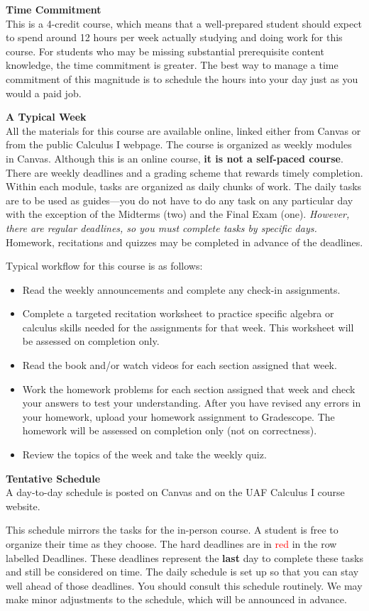 \documentclass[12pt]{article}
\renewcommand{\emph}[1]{\textsf{\textbf{#1}}}
\newcommand{\localhead}[1]{\par\smallskip\textbf{#1}\nobreak\\}%
\def\heading#1{\localhead{\large\emph{#1}}}
\begin{document}
\heading{Time Commitment}
This is a 4-credit course, which means that a well-prepared student should expect to spend around 12
hours per week actually studying and doing work for this course. For students who may be missing substantial
prerequisite content knowledge, the time commitment is greater. The best way to manage a time
commitment of this magnitude is to schedule the hours into your day just as you would a paid job.

\heading{A Typical Week}
All the materials for this course are available online, linked either from Canvas or from the public Calculus I webpage. The course is organized as weekly modules in Canvas. Although this is an online course, \emph{it is not a self-paced course}. There are weekly
deadlines and a grading scheme that rewards timely completion. Within each module, tasks are
organized as daily chunks of work. The daily tasks are to be used as guides---you do not have
to do any task on any particular day with the exception of the Midterms (two) and the
Final Exam (one). \textit{However, there are regular deadlines, so you must complete tasks by specific days.} Homework, recitations and quizzes may be completed in advance of the deadlines. 

Typical workflow for this course is as follows: 
\begin{itemize}
\item Read the weekly announcements and complete any check-in assignments.
\item Complete a targeted recitation worksheet to practice specific algebra or calculus skills needed for the assignments for that week. This worksheet will be assessed on completion only.
\item Read the book and/or watch videos for each section assigned that week.
\item Work the homework problems for each section assigned that week and check your answers to test your understanding. After you have revised any errors in your homework, upload your homework assignment to Gradescope. The homework will be assessed on completion only (not on correctness).
\item Review the topics of the week and take the weekly quiz.
\end{itemize}

\heading{Tentative Schedule}
A day-to-day schedule is posted on Canvas and on the UAF Calculus I course website. 

This schedule mirrors the tasks for the in-person course. A student is free to organize their time as they choose. The hard deadlines are in
\textcolor{red}{red} in the row labelled Deadlines. These deadlines represent the \textbf{last} day to complete these tasks
and still be considered on time. The daily schedule is set up so that you can stay well ahead of
those deadlines. You should consult this schedule routinely. We may make minor adjustments to
the schedule, which will be announced in advance.
\end{document}
